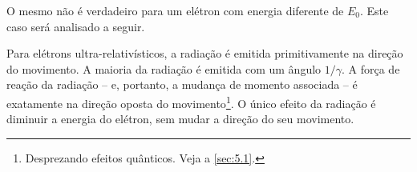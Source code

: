 O mesmo não é verdadeiro para um elétron com energia diferente de $E_0$. Este caso será analisado a seguir.

Para elétrons ultra-relativísticos, a radiação é emitida primitivamente na direção do movimento. A maioria da radiação é emitida com um ângulo $1/\gamma$. A força de reação da radiação -- e, portanto, a mudança de momento associada -- é exatamente na direção oposta do movimento\footnote{Desprezando efeitos quânticos. Veja a \autoref{sec:5.1}.}. O único efeito da radiação é diminuir a energia do elétron, sem mudar a direção do seu movimento.